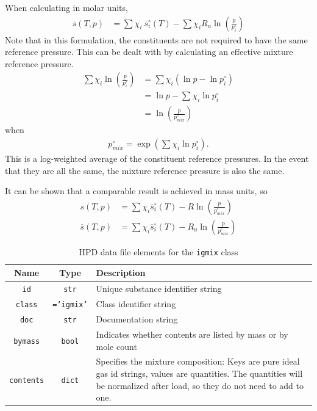 When calculating in molar units,
\begin{align*}
\overline{s}(T,p) &= \sum \chi_i\ \overline{s}^\circ_i(T) - \sum \chi_i R_u \ln\left(\frac{p}{p^\circ_i}\right)
\end{align*}
Note that in this formulation, the constituents are not required to have the same reference pressure.  This can be dealt with by calculating an effective mixture reference pressure.  
\begin{align*}
\sum \chi_i \ln\left(\frac{p}{p^\circ_i}\right) &= \sum \chi_i \left( \ln p - \ln p^\circ_i \right)\\
&= \ln p - \sum \chi_i \ln p^\circ_i\\
&= \ln \left(\frac{p}{p^\circ_{mix}}\right)
\end{align*}
when
\begin{align}
p^\circ_{mix} = \exp\left(\sum \chi_i \ln p^\circ_i \right).
\end{align}
This is a log-weighted average of the constituent reference pressures.  In the event that they are all the same, the mixture reference pressure is also the same.

It can be shown that a comparable result is achieved in mass units, so
\begin{subequations}
\begin{align}
s(T,p) &= \sum \chi_i \overline{s}^\circ_i(T) - R \ln\left(\frac{p}{p^\circ_{mix}}\right)\\
\overline{s}(T,p) &= \sum \chi_i \overline{s}^\circ_i(T) - R_u \ln\left(\frac{p}{p^\circ_{mix}}\right)
\end{align}
\end{subequations}

\begin{table}
\centering
\caption{HPD data file elements for the \texttt{igmix} class}\label{tab:class:igmix}
\begin{tabular}{|ccp{2.5in}|}
\hline
Name & Type & Description\\
\hline
\texttt{id} & \texttt{str} & Unique substance identifier string\\
\texttt{class} & \texttt{='igmix'} & Class identifier string\\
\texttt{doc} & \texttt{str} & Documentation string\\
\hline
\texttt{bymass} & \texttt{bool} & Indicates whether contents are listed by mass or by mole count\\
\texttt{contents} & \texttt{dict} & Specifies the mixture composition: Keys are pure ideal gas id strings, values are quantities.  The quantities will be normalized after load, so they do not need to add to one.\\
\hline
\end{tabular}
\end{table}

